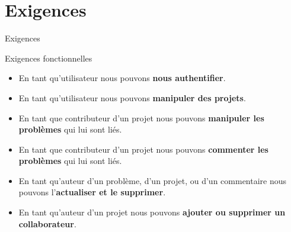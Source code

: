 \section{Exigences}

\begin{frame}{Exigences}
  \begin{block}{Exigences fonctionnelles}
    \begin{itemize}
    \item En tant qu'utilisateur nous pouvons \textbf{nous authentifier}.
    \item En tant qu'utilisateur nous pouvons \textbf{manipuler des projets}.
    \item En tant que contributeur d'un projet nous pouvons
      \textbf{manipuler les problèmes} qui lui sont liés.
    \item En tant que contributeur d'un projet nous pouvons
      \textbf{commenter les problèmes} qui lui sont liés.
    \item En tant qu'auteur d'un problème, d'un projet, ou d'un
      commentaire nous pouvons l'\textbf{actualiser et le supprimer}.
    \item En tant qu'auteur d'un projet nous pouvons \textbf{ajouter
      ou supprimer un collaborateur}.
    \end{itemize}
  \end{block}
\end{frame}

